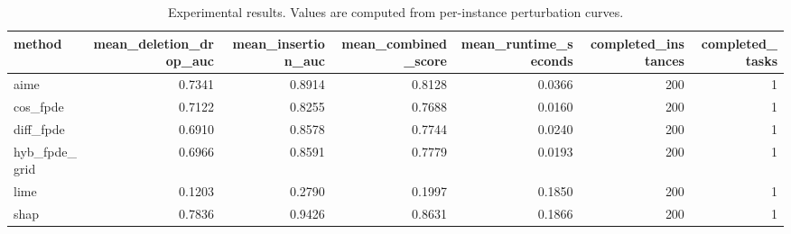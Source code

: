 \begin{table}[t]
\caption{Experimental results. Values are computed from per-instance perturbation curves.}
\label{tab:main_results_computed}
\centering
\begin{tabular}{lrrrrrr}
\toprule
method & mean\_deletion\_drop\_auc & mean\_insertion\_auc & mean\_combined\_score & mean\_runtime\_seconds & completed\_instances & completed\_tasks \\
\midrule
aime & 0.7341 & 0.8914 & 0.8128 & 0.0366 & 200 & 1 \\
cos\_fpde & 0.7122 & 0.8255 & 0.7688 & 0.0160 & 200 & 1 \\
diff\_fpde & 0.6910 & 0.8578 & 0.7744 & 0.0240 & 200 & 1 \\
hyb\_fpde\_grid & 0.6966 & 0.8591 & 0.7779 & 0.0193 & 200 & 1 \\
lime & 0.1203 & 0.2790 & 0.1997 & 0.1850 & 200 & 1 \\
shap & 0.7836 & 0.9426 & 0.8631 & 0.1866 & 200 & 1 \\
\bottomrule
\end{tabular}

\end{table}
